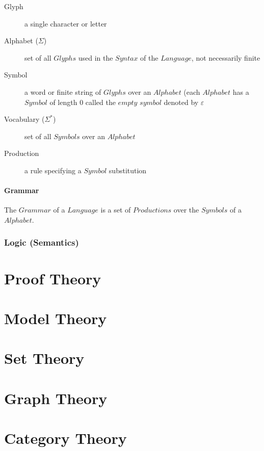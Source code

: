 \documentclass{article}
\begin{document}
    \begin{description}

    \item[Glyph]

    a single character or letter

    \item[Alphabet ($\Sigma$)]

    set of all $Glyphs$ used in the $Syntax$ of the $Language$, not
    necessarily finite

    \item[Symbol]

    a word or finite string of $Glyphs$ over an $Alphabet$ (each
    $Alphabet$ has a $Symbol$ of length 0 called the $empty$ $symbol$
    denoted by $\varepsilon$

    \item[Vocabulary ($\Sigma^{*}$)]

    set of all $Symbols$ over an $Alphabet$

    \item[Production]

    a rule specifying a $Symbol$ substitution

    \end{description}

\subsection{Grammar}

The $Grammar$ of a $Language$ is a set of $Productions$ over the
$Symbols$ of a $Alphabet$.

\section{Logic (Semantics)}


\part{Proof Theory}


\part{Model Theory}


\part{Set Theory}


\part{Graph Theory}


\part{Category Theory}

\end{document}
